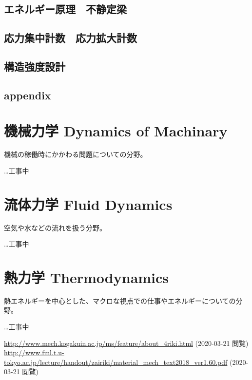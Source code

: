 \documentclass[a4j,10pt,oneside,openany]{jsbook}
\begin{document}
\section{エネルギー原理　不静定梁}
\section{応力集中計数　応力拡大計数}
\section{構造強度設計}
\section{appendix}
\chapter{機械力学 Dynamics of Machinary}
機械の稼働時にかかわる問題についての分野。

…工事中


\chapter{流体力学 Fluid Dynamics}
空気や水などの流れを扱う分野。

…工事中

\chapter{熱力学 Thermodynamics}
熱エネルギーを中心とした、マクロな視点での仕事やエネルギーについての分野。

…工事中


\begin{thebibliography}{20}
  \url{http://www.mech.kogakuin.ac.jp/ms/feature/about_4riki.html} (2020-03-21 閲覧)
  \url{http://www.fml.t.u-tokyo.ac.jp/lecture/handout/zairiki/material_mech_text2018_ver1.60.pdf} (2020-03-21 閲覧)
\end{thebibliography}
\newpage
\printindex
%
%
\end{document}
